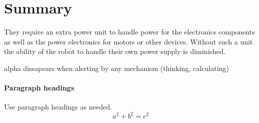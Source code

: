 \section{Summary}

They require an extra power unit to handle power for the electronics components as well as the power electronics for motors or other devices.  Without such a unit the ability of the robot to handle their own power supply is diminished.


alpha dissapears when alerting by any mechanism (thinking, calculating)

\paragraph{Paragraph headings} Use paragraph headings as needed.
\begin{equation}
a^2+b^2=c^2
\end{equation}

